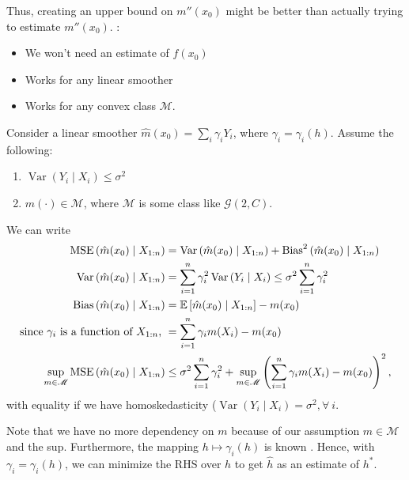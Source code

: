 Thus, creating an upper bound on $m''(x_0)$ might be better than actually trying to estimate $m''(x_0)$.
:
\begin{itemize}
	\item We won't need an estimate of $f(x_0)$
	\item Works for any linear smoother
	\item Works for any convex class $\mathscr{M}$.
\end{itemize}
Consider a linear smoother $\hat{m}(x_0) = \sum_{i}^{} \gamma_i Y_i$, where $\gamma_i = \gamma_i(h)$. 
Assume the following:
\begin{enumerate}[label=(\roman*)]
	\item $\operatorname{Var}\left(Y_i \mid X_i\right) \le \sigma^2$
	\item $m(\cdot ) \in \mathscr{M}$, where $\mathscr{M}$ is some class like $\mathscr{G}(2,C)$.
\end{enumerate}

We can write
\begin{align*}
	\operatorname{MSE}\left( \hat{m}(x_0) \mid X_{1:n} \right) &= \operatorname{Var}\left(\hat{m}(x_0) \mid X_{1:n}\right) + \operatorname{Bias}^2\left(\hat{m}(x_0) \mid X_{1:n}\right) \\
	\operatorname{Var}\left(\hat{m}(x_0) \mid X_{1:n}\right) &= \sum\limits_{i=1}^{n} \gamma_i^2 \operatorname{Var}\left(Y_i \mid X_i\right) \le \sigma^2 \sum\limits_{i=1}^{n} \gamma_i^2 \\
	\operatorname{Bias}\left(\hat{m}(x_0) \mid X_{1:n}\right) &= \mathbb{E}\left[\hat{m}(x_0) \mid X_{1:n}\right] - m(x_0) \\
	\text{since $\gamma_i$ is a function of $X_{1:n}$, } &= \sum\limits_{i=1}^{n} \gamma_i m(X_i) - m(x_0) \\
	\sup_{m \in \mathscr{M}} \operatorname{MSE}\left( \hat{m}(x_0) \mid X_{1:n} \right) &\le \sigma^2 \sum\limits_{i=1}^{n} \gamma_i^2 + \sup_{m \in \mathscr{M}} \left( \sum\limits_{i=1}^{n} \gamma_i m(X_i) - m(x_0) \right)^2
,\end{align*}
with equality if we have homoskedasticity ($\operatorname{Var}\left(Y_i \mid X_i\right) = \sigma^2, \forall\ i$.

Note that we have no more dependency on $m$ because of our assumption $m \in \mathscr{M}$ and the sup. Furthermore, the mapping $h \mapsto \gamma_i(h)$ is known .
Hence, with $\gamma_i = \gamma_i(h)$, we can minimize the RHS over $h$ to get $\hat{h}$ as an estimate of $h^*$.

